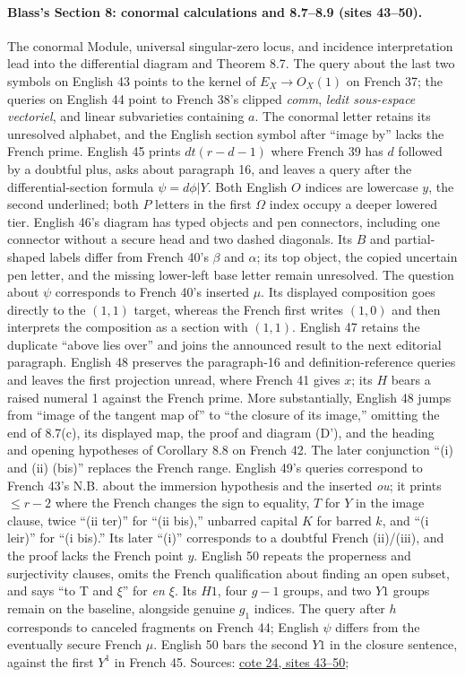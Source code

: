 \paragraph{Blass's Section 8: conormal calculations and 8.7--8.9 (sites 43--50).}
The conormal Module, universal singular-zero locus, and incidence interpretation lead into the differential diagram and Theorem 8.7. The query about the last two symbols on English 43 points to the kernel of $E_X\to O_X(1)$ on French 37; the queries on English 44 point to French 38's clipped \emph{comm}, \emph{ledit sous-espace vectoriel}, and linear subvarieties containing $a$. The conormal letter retains its unresolved alphabet, and the English section symbol after ``image by'' lacks the French prime. English 45 prints $dt(r-d-1)$ where French 39 has $d$ followed by a doubtful plus, asks about paragraph 16, and leaves a query after the differential-section formula $\psi=d\phi|Y$. Both English $O$ indices are lowercase $y$, the second underlined; both $P$ letters in the first $\Omega$ index occupy a deeper lowered tier. English 46's diagram has typed objects and pen connectors, including one connector without a secure head and two dashed diagonals. Its $B$ and partial-shaped labels differ from French 40's $\beta$ and $\alpha$; its top object, the copied uncertain pen letter, and the missing lower-left base letter remain unresolved. The question about $\psi$ corresponds to French 40's inserted $\mu$. Its displayed composition goes directly to the $(1,1)$ target, whereas the French first writes $(1,0)$ and then interprets the composition as a section with $(1,1)$. English 47 retains the duplicate ``above lies over'' and joins the announced result to the next editorial paragraph. English 48 preserves the paragraph-16 and definition-reference queries and leaves the first projection unread, where French 41 gives $x$; its $H$ bears a raised numeral 1 against the French prime. More substantially, English 48 jumps from ``image of the tangent map of'' to ``the closure of its image,'' omitting the end of 8.7(c), its displayed map, the proof and diagram (D'), and the heading and opening hypotheses of Corollary 8.8 on French 42. The later conjunction ``(i) and (ii) (bis)'' replaces the French range. English 49's queries correspond to French 43's N.B. about the immersion hypothesis and the inserted \emph{ou}; it prints $\leq r-2$ where the French changes the sign to equality, $T$ for $Y$ in the image clause, twice ``(ii ter)'' for ``(ii bis),'' unbarred capital $K$ for barred $k$, and ``(i leir)'' for ``(i bis).'' Its later ``(i)'' corresponds to a doubtful French (ii)/(iii), and the proof lacks the French point $y$. English 50 repeats the properness and surjectivity clauses, omits the French qualification about finding an open subset, and says ``to T and $\xi$'' for \emph{en $\xi$}. Its $H1$, four $g-1$ groups, and two $Y1$ groups remain on the baseline, alongside genuine $g_1$ indices. The query after $h$ corresponds to canceled fragments on French 44; English $\psi$ differs from the eventually secure French $\mu$. English 50 bars the second $Y1$ in the closure sentence, against the first $Y^1$ in French 45. Sources: \href{https://grothendieck.umontpellier.fr/web/viewer.html?file=../24.pdf\#page=44}{cote 24, sites 43--50}; 